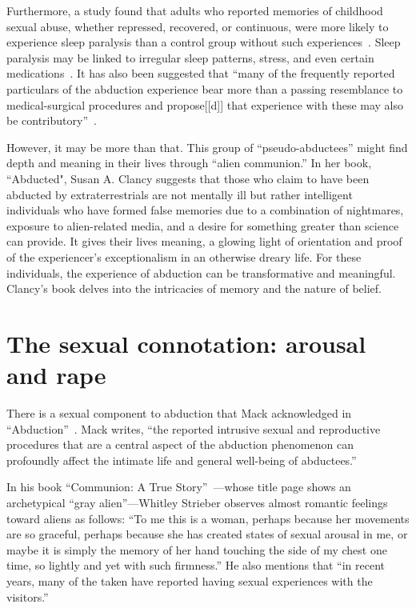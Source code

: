Furthermore, a study found that adults who reported memories of childhood sexual abuse, whether repressed, recovered, or continuous,
were more likely to experience sleep paralysis than a control group without such experiences~\cite{McNally-Clancy}.
Sleep paralysis may be linked to irregular sleep patterns, stress,
and even certain medications~\cite{Sharpless_2016}.
It has also been suggested that ``many of the frequently reported particulars of the abduction experience
bear more than a passing resemblance to medical-surgical procedures
and propose[[d]] that experience with these may also be contributory''~\cite{Forrest_2008}.

However, it may be more than that. This group of ``pseudo-abductees'' might find depth and meaning in their lives through ``alien communion.'' In her book, ``Abducted"\cite{Clancy2007Apr}, Susan A. Clancy suggests that those who claim to have been abducted by extraterrestrials are not mentally ill but rather intelligent individuals who have formed false memories due to a combination of nightmares, exposure to alien-related media, and a desire for something greater than science can provide. It gives their lives meaning\cite{Frankl2006Jun}, a glowing light of orientation and proof of the experiencer's exceptionalism in an otherwise dreary life. For these individuals, the experience of abduction can be transformative and meaningful. Clancy's book delves into the intricacies of memory and the nature of belief.


\section{The sexual connotation: arousal and rape}
\label{2023-UFO-part-Perception-abductions-sexual}

There is a sexual component to abduction that Mack acknowledged in ``Abduction''~\cite{Mack1994Apr}.
Mack writes, ``the reported intrusive sexual and reproductive procedures that are a central aspect
of the abduction phenomenon can profoundly affect the intimate life and general well-being of abductees.''

In his book ``{C}ommunion: {A} True Story''~\cite{Strieber1987Jan}---whose title page shows an archetypical ``gray alien''---Whitley Strieber
observes almost romantic feelings toward aliens as follows: ``To me this is a woman, perhaps because her movements are so graceful,
perhaps because she has created states of sexual arousal in me, or maybe it is simply the memory of her hand touching the side of my chest one time,
so lightly and yet with such firmness.''
He also mentions that ``in recent years, many of the taken have reported having sexual experiences with the visitors.''

